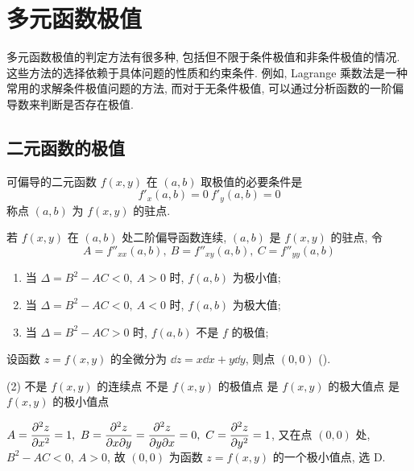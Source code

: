 \section{多元函数极值}

多元函数极值的判定方法有很多种, 包括但不限于条件极值和非条件极值的情况. 这些方法的选择依赖于具体问题的性质和约束条件. 例如, Lagrange 乘数法是一种常用的求解条件极值问题的方法, 而对于无条件极值, 可以通过分析函数的一阶偏导数来判断是否存在极值. 

\subsection{二元函数的极值}

\begin{theorem}[二元函数取极值的必要条件]
    可偏导的二元函数 $f(x,y)$ 在 $(a,b)$ 取极值的必要条件是
    $$f'_x(a,b)=0~  f'_y(a,b)=0$$
    称点 $(a,b)$ 为 $f(x,y)$ 的驻点.
\end{theorem}

\begin{theorem}[二元函数取极值的充分条件]
    若 $f(x,y)$ 在 $(a,b)$ 处二阶偏导函数连续, $(a,b)$ 是 $f(x,y)$ 的驻点, 令
    $$A=f''_{xx}(a,b),~  B=f''_{xy}(a,b),~  C=f''_{yy}(a,b)$$
    \begin{enumerate}[label=(\arabic{*})]
        \item 当 $\Delta=B^2-AC<0,~A>0$ 时, $f(a,b)$ 为极小值;
        \item 当 $\Delta=B^2-AC<0,~A<0$ 时, $f(a,b)$ 为极大值;
        \item 当 $\Delta=B^2-AC>0$ 时, $f(a,b)$ 不是 $f$ 的极值;
    \end{enumerate}
\end{theorem}

\begin{example}[2009 数二]
    设函数 $z=f(x,y)$ 的全微分为 $\dd z=x\dd x+y\dd y$, 则点 $(0,0)$ (\quad).
    \begin{tasks}(2)
        \task 不是 $f(x,y)$ 的连续点
        \task 不是 $f(x,y)$ 的极值点
        \task 是 $f(x,y)$ 的极大值点
        \task 是 $f(x,y)$ 的极小值点
    \end{tasks}
\end{example}
\begin{solution}
    $\displaystyle A=\pdv[2]{z}{x}=1,~B=\pdv{z}{x}{y}=\pdv{z}{y}{x}=0,~C=\pdv[2]{z}{y}=1$, 又在点 $(0,0)$ 处, $B^2-AC<0,~A>0$, 故 $(0,0)$ 为函数 $z=f(x,y)$ 的一个极小值点, 选 D.
\end{solution}

